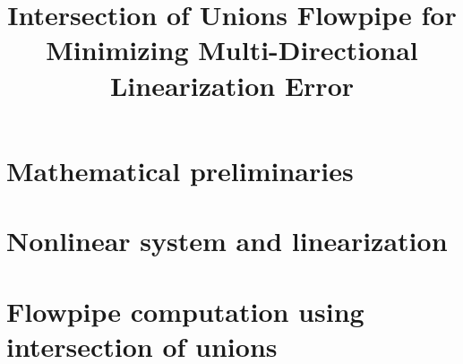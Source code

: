 


\title{Intersection of Unions Flowpipe for Minimizing Multi-Directional Linearization Error}
\author{}
\institute{}
%
    
\maketitle
%
\section{Mathematical preliminaries}

%
\section{Nonlinear system and linearization}

%
\section{Flowpipe computation using intersection of unions}













